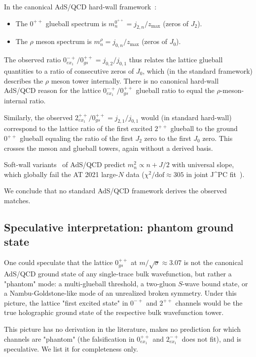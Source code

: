 \documentclass[reprint,prd,amsmath,amssymb,nofootinbib,superscriptaddress]{revtex4-2}
\newcommand{\jbz}[2]{j_{#1,#2}}      %
\begin{document}
In the canonical AdS/QCD hard-wall framework~\cite{BoschiFilhoBraga2002, ErlichKatzSonStephanov2005}:
\begin{itemize}
  \item The $0^{++}$ glueball spectrum is $m_n^{0^{++}} = \jbz{2}{n}/z_{\max}$ (zeros of $J_2$).
  \item The $\rho$ meson spectrum is $m_n^{\rho} = \jbz{0}{n}/z_{\max}$ (zeros of $J_0$).
\end{itemize}
The observed ratio $0^{-+}_{ex_1}/0^{++}_{gs} = \jbz{0}{2}/\jbz{0}{1}$ thus relates the lattice glueball quantities to a ratio of consecutive zeros of $J_0$, which (in the standard framework) describes the $\rho$ meson tower internally. There is no canonical hard-wall AdS/QCD reason for the lattice $0^{-+}_{ex_1}/0^{++}_{gs}$ glueball ratio to equal the $\rho$-meson-internal ratio.

Similarly, the observed $2^{++}_{ex_1}/0^{++}_{gs} = \jbz{2}{1}/\jbz{0}{1}$ would (in standard hard-wall) correspond to the lattice ratio of the first excited $2^{++}$ glueball to the ground $0^{++}$ glueball equaling the ratio of the first $J_2$ zero to the first $J_0$ zero. This crosses the meson and glueball towers, again without a derived basis.

Soft-wall variants~\cite{KarchKatzSonStephanov2006, ColangeloDeFazioJugeauNicotri2007} of AdS/QCD predict $m_n^2 \propto n + J/2$ with universal slope, which globally fail the AT 2021 large-$N$ data ($\chi^2/\mathrm{dof} \approx 305$ in joint J^{PC} fit~\cite{HybridFramework2026}).

We conclude that no standard AdS/QCD framework derives the observed matches.

\subsection{Speculative interpretation: phantom ground state}

One could speculate that the lattice $0^{++}_{gs}$ at $m/\sqrt{\sigma} \approx 3.07$ is not the canonical AdS/QCD ground state of any single-trace bulk wavefunction, but rather a "phantom" mode: a multi-glueball threshold, a two-gluon $S$-wave bound state, or a Nambu-Goldstone-like mode of an unrealized broken symmetry. Under this picture, the lattice "first excited state" in $0^{-+}$ and $2^{++}$ channels would be the true holographic ground state of the respective bulk wavefunction tower.

This picture has no derivation in the literature, makes no prediction for which channels are "phantom" (the falsification in $0^{++}_{ex_1}$ and $2^{-+}_{ex_1}$ does not fit), and is speculative. We list it for completeness only.
\end{document}
